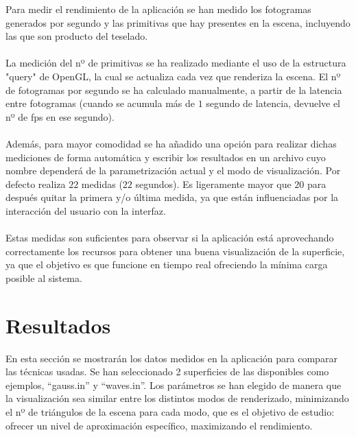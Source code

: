 	Para medir el rendimiento de la aplicación se han medido los fotogramas generados por segundo y las primitivas que hay presentes en la escena, incluyendo las que son producto del teselado.\\
\\La medición del nº de primitivas se ha realizado mediante el uso de la estructura "query" de OpenGL, la cual se actualiza cada vez que renderiza la escena. El nº de fotogramas por segundo se ha calculado manualmente, a partir de la latencia entre fotogramas (cuando se acumula más de $1$ segundo de latencia, devuelve el nº de fps en ese segundo).\\
\\Además, para mayor comodidad se ha añadido una opción para realizar dichas mediciones de forma automática y escribir los resultados en un archivo cuyo nombre dependerá de la parametrización actual y el modo de visualización. Por defecto realiza $22$ medidas ($22$ segundos). Es ligeramente mayor que $20$ para después quitar la primera y/o última medida, ya que están influenciadas por la interacción del usuario con la interfaz.\\
\\Estas medidas son suficientes para observar si la aplicación está aprovechando correctamente los recursos para obtener una buena visualización de la superficie, ya que el objetivo es que funcione en tiempo real ofreciendo la mínima carga posible al sistema.

\section{Resultados}
	En esta sección se mostrarán los datos medidos en la aplicación para comparar las técnicas usadas. Se han seleccionado 2 superficies de las disponibles como ejemplos, ``gauss.in'' y ``waves.in''. Los parámetros se han elegido de manera que la visualización sea similar entre los distintos modos de renderizado, minimizando el nº de triángulos de la escena para cada modo, que es el objetivo de estudio: ofrecer un nivel de aproximación específico, maximizando el rendimiento.
		
